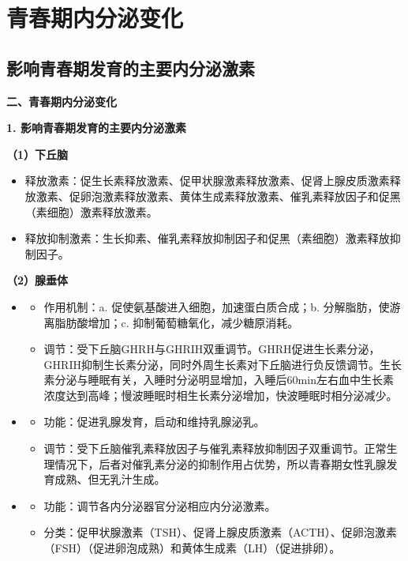 \section{青春期内分泌变化}

\subsection{影响青春期发育的主要内分泌激素}

\begin{keybox}
\textbf{二、青春期内分泌变化}

\textbf{1. 影响青春期发育的主要内分泌激素}

\textbf{（1）下丘脑}
\begin{itemize}[leftmargin=*]
    \item 释放激素：促生长素释放激素、促甲状腺激素释放激素、促肾上腺皮质激素释放激素、促卵泡激素释放激素、黄体生成素释放激素、催乳素释放因子和促黑（素细胞）激素释放激素。
    \item 释放抑制激素：生长抑素、催乳素释放抑制因子和促黑（素细胞）激素释放抑制因子。
\end{itemize}

\textbf{（2）腺垂体}
\begin{itemize}[leftmargin=*]
    \item {}
    \begin{itemize}[leftmargin=*]
        \item 作用机制：a. 促使氨基酸进入细胞，加速蛋白质合成；b. 分解脂肪，使游离脂肪酸增加；c. 抑制葡萄糖氧化，减少糖原消耗。
        \item 调节：受下丘脑GHRH与GHRIH双重调节。GHRH促进生长素分泌，GHRIH抑制生长素分泌，同时外周生长素对下丘脑进行负反馈调节。生长素分泌与睡眠有关，入睡时分泌明显增加，入睡后60min左右血中生长素浓度达到高峰；慢波睡眠时相生长素分泌增加，快波睡眠时相分泌减少。
    \end{itemize}
    \item {}
    \begin{itemize}[leftmargin=*]
        \item 功能：促进乳腺发育，启动和维持乳腺泌乳。
        \item 调节：受下丘脑催乳素释放因子与催乳素释放抑制因子双重调节。正常生理情况下，后者对催乳素分泌的抑制作用占优势，所以青春期女性乳腺发育成熟、但无乳汁生成。
    \end{itemize}
    \item {}
    \begin{itemize}[leftmargin=*]
        \item 功能：调节各内分泌器官分泌相应内分泌激素。
        \item 分类：促甲状腺激素（TSH）、促肾上腺皮质激素（ACTH）、促卵泡激素（FSH）（促进卵泡成熟）和黄体生成素（LH）（促进排卵）。
    \end{itemize}
\end{itemize}


\end{keybox}
